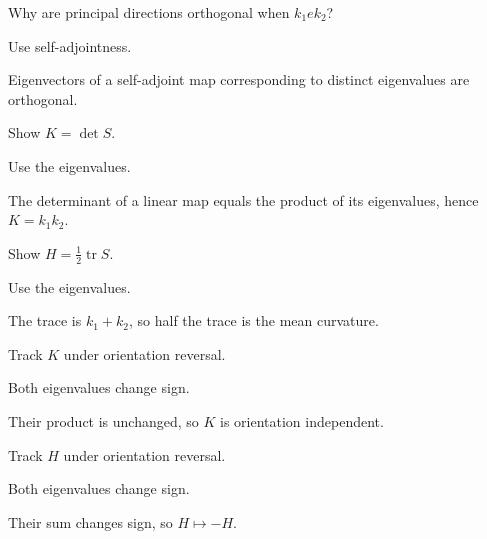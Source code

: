 \begin{exercise}\label{exr:vii17-03}
Why are principal directions orthogonal when \(k_1
e k_2\)?
\end{exercise}
\begin{hint}
Use self-adjointness.
\end{hint}
\begin{solution}
Eigenvectors of a self-adjoint map corresponding to distinct eigenvalues are orthogonal.
\end{solution}

\begin{exercise}\label{exr:vii17-04}
Show \(K=\det S\).
\end{exercise}
\begin{hint}
Use the eigenvalues.
\end{hint}
\begin{solution}
The determinant of a linear map equals the product of its eigenvalues, hence \(K=k_1k_2\).
\end{solution}

\begin{exercise}\label{exr:vii17-05}
Show \(H=\frac12\operatorname{tr}S\).
\end{exercise}
\begin{hint}
Use the eigenvalues.
\end{hint}
\begin{solution}
The trace is \(k_1+k_2\), so half the trace is the mean curvature.
\end{solution}

\begin{exercise}\label{exr:vii17-06}
Track \(K\) under orientation reversal.
\end{exercise}
\begin{hint}
Both eigenvalues change sign.
\end{hint}
\begin{solution}
Their product is unchanged, so \(K\) is orientation independent.
\end{solution}

\begin{exercise}\label{exr:vii17-07}
Track \(H\) under orientation reversal.
\end{exercise}
\begin{hint}
Both eigenvalues change sign.
\end{hint}
\begin{solution}
Their sum changes sign, so \(H\mapsto-H\).
\end{solution}

